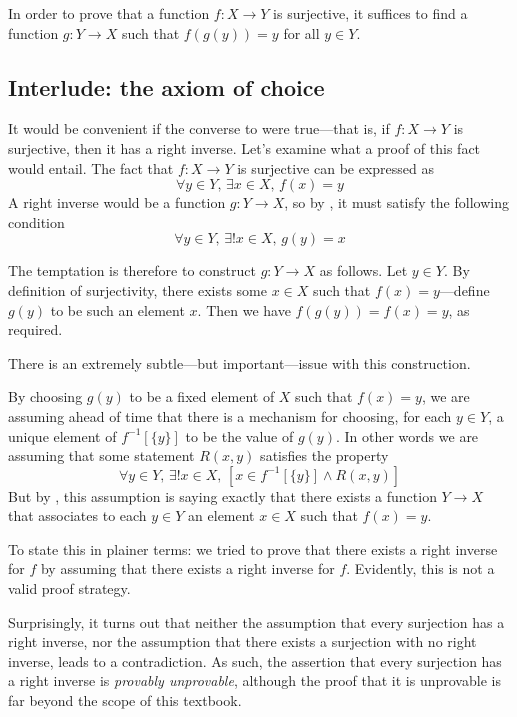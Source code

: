 \begin{strategy}
In order to prove that a function $f : X \to Y$ is surjective, it suffices to find a function $g : Y \to X$ such that $f(g(y)) = y$ for all $y \in Y$.
\end{strategy}

\subsection*{Interlude: the axiom of choice}

It would be convenient if the converse to  were true---that is, if $f : X \to Y$ is surjective, then it has a right inverse. Let's examine what a proof of this fact would entail. The fact that $f : X \to Y$ is surjective can be expressed as
\[ \forall y \in Y,\, \exists x \in X,\, f(x) = y \]
A right inverse would be a function $g : Y \to X$, so by , it must satisfy the following condition
\[ \forall y \in Y,\, \exists ! x \in X,\, g(y) = x \]

The temptation is therefore to construct $g : Y \to X$ as follows. Let $y \in Y$. By definition of surjectivity, there exists some $x \in X$ such that $f(x) = y$---define $g(y)$ to be such an element $x$. Then we have $f(g(y)) = f(x) = y$, as required.

There is an extremely subtle---but important---issue with this construction.

By choosing $g(y)$ to be a fixed element of $X$ such that $f(x) = y$, we are assuming ahead of time that there is a mechanism for choosing, for each $y \in Y$, a unique element of $f^{-1}[\{y\}]$ to be the value of $g(y)$. In other words we are assuming that some statement $R(x,y)$ satisfies the property
\[ \forall y \in Y,\, \exists ! x \in X,\, [x \in f^{-1}[\{y\}] \wedge R(x,y)] \]
But by , this assumption is saying exactly that there exists a function $Y \to X$ that associates to each $y \in Y$ an element $x \in X$ such that $f(x) = y$.

To state this in plainer terms: we tried to prove that there exists a right inverse for $f$ by assuming that there exists a right inverse for $f$. Evidently, this is not a valid proof strategy.

Surprisingly, it turns out that neither the assumption that every surjection has a right inverse, nor the assumption that there exists a surjection with no right inverse, leads to a contradiction. As such, the assertion that every surjection has a right inverse is \textit{provably unprovable}, although the proof that it is unprovable is far beyond the scope of this textbook.

